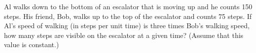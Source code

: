Al walks down to the bottom of an escalator that is moving up and he counts 150 steps.  His friend, Bob, walks up to the top of the escalator and counts 75 steps.  If Al's speed of walking (in steps per unit time) is three times Bob's walking speed, how many steps are visible on the escalator at a given time?  (Assume that this value is constant.)